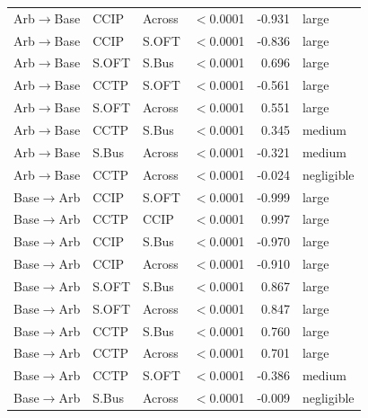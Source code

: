 \begin{table}[ht]
\begin{tabular}{lllrrl}
Arb$\to$Base & CCIP & Across & $<$0.0001 & -0.931 & large \\
Arb$\to$Base & CCIP & S.OFT & $<$0.0001 & -0.836 & large \\
Arb$\to$Base & S.OFT & S.Bus & $<$0.0001 & 0.696 & large \\
Arb$\to$Base & CCTP & S.OFT & $<$0.0001 & -0.561 & large \\
Arb$\to$Base & S.OFT & Across & $<$0.0001 & 0.551 & large \\
Arb$\to$Base & CCTP & S.Bus & $<$0.0001 & 0.345 & medium \\
Arb$\to$Base & S.Bus & Across & $<$0.0001 & -0.321 & medium \\
Arb$\to$Base & CCTP & Across & $<$0.0001 & -0.024 & negligible \\
\midrule
Base$\to$Arb & CCIP & S.OFT & $<$0.0001 & -0.999 & large \\
Base$\to$Arb & CCTP & CCIP & $<$0.0001 & 0.997 & large \\
Base$\to$Arb & CCIP & S.Bus & $<$0.0001 & -0.970 & large \\
Base$\to$Arb & CCIP & Across & $<$0.0001 & -0.910 & large \\
Base$\to$Arb & S.OFT & S.Bus & $<$0.0001 & 0.867 & large \\
Base$\to$Arb & S.OFT & Across & $<$0.0001 & 0.847 & large \\
Base$\to$Arb & CCTP & S.Bus & $<$0.0001 & 0.760 & large \\
Base$\to$Arb & CCTP & Across & $<$0.0001 & 0.701 & large \\
Base$\to$Arb & CCTP & S.OFT & $<$0.0001 & -0.386 & medium \\
Base$\to$Arb & S.Bus & Across & $<$0.0001 & -0.009 & negligible \\
\bottomrule
\end{tabular}
\endgroup
\end{table}

